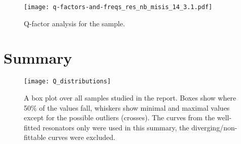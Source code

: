 \documentclass[12pt]{article}
\numberwithin{equation}{section}
\numberwithin{figure}{section}
\begin{document}
\begin{figure}[h!]
\centering
\texttt{[image: q-factors-and-freqs\_res\_nb\_misis\_14\_3.1.pdf]}

\caption{Q-factor analysis for the sample.}
\end{figure}

\newpage

\section{Summary}

\begin{figure}[h!]
\centering
\texttt{[image: Q\_distributions]}
\caption{A box plot over all samples studied in the report. Boxes show where 50\% of the values fall, whiskers show minimal and maximal values except for the possible outliers (crosses). The curves from the well-fitted resonators only were used in this summary, the diverging/non-fittable curves were excluded.}
\end{figure}



\begin{comment}

Two resonator samples were studied, fabricated from Al and Nb films. Using the  \textit{circlefit} method the quality factors and frequencies were extracted at various probe powers ranging from single photon occupation regime to high powers.

The Nb sample has shown errors less than 1\% in frequency and more or less consistent quality factors; however, for the devices IV and VI $Q_e$ are significantly lower than for the rest. The internal quality factors have demonstrated an expected behaviour when the probe power was changed, ranging from $1.5\cdot10^4$ at single-photon level to maximum of $1.2 \cdot 10^5$ at high powers. The single-photon Q-factors are all similar heralding the uniform distribution of defects on the chip.

The Al sample has shown less than 2\% errors in frequency; however, if the correction for the wrong $\varepsilon_{Si}$ used in the calculation is applied, the errors would rise up to 3\%. The external quality factors are in deviation from the rest of the resonators for the devices III and VI. The internal quality factors are more uniform in values compared to the Nb sample, significantly lower at high powers and significantly higher at single-photon level. All values are in the range between $3\cdot10^4$ and $6 \cdot 10^4$.

In conclusion, it should be stated that Al technology is more suitable for the cQED experiments due to the apparently lower concentration of defects inside the surface oxide. However, the technological issues with fabricating aluminium chips at MIPT still are to be overcome. High hopes are anchored on NbN films which are known to have a large superconducting gap, and thus a suppressed quasiparticle concentration and no natural oxide layer in contrast to Nb or Al.
\end{comment}


\newpage



\end{document}
